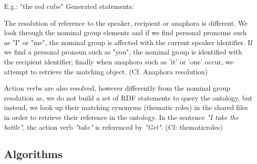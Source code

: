 \documentclass[twoside,a4paper,10pt]{report}
\begin{document}
E.g.:  "the red cube"
  Generated statements:


\small
\begin{verbatimtab}
\end{verbatimtab}
\normalsize

The resolution of reference to the speaker, recipient or anaphora is different. We look through the nominal group elements and if we find personal pronouns such as "I" or "me", the nominal group is affected with the current speaker identifier.
 If we find a personal pronoun such as "you", the nominal group is identified with the recipient identifier; finally when anaphora such as 'it' or 'one' occur, we attempt to retrieve the matching object. (Cf. Anaphora resolution)


Action verbs are also resolved, however differently from the nominal group resolution as, we do not build a set of RDF statements to query the ontology, but instead, we look up their matching synonyms (thematic roles) in the shared files in order to retrieve their reference in the ontology. In the sentence \textsl{"I take the bottle"}, the action verb \textsl{"take"} is referenced by \textsl{"Get"}. (Cf: thematic{\textunderscore}roles)

\subsection{Algorithms}
\end{document}
